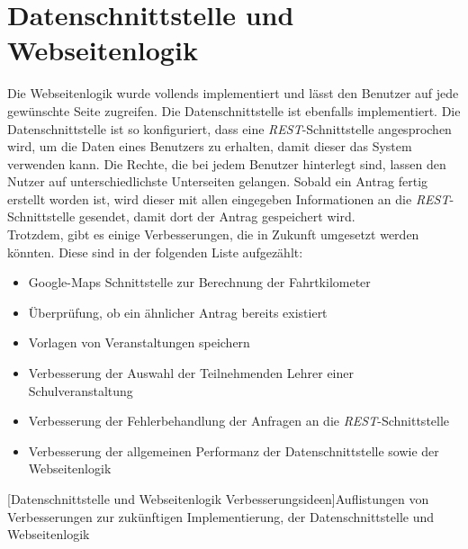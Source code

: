 \section{Datenschnittstelle und Webseitenlogik}
Die Webseitenlogik wurde vollends implementiert und lässt den Benutzer auf jede gewünschte Seite zugreifen. Die Datenschnittstelle ist ebenfalls implementiert. Die Datenschnittstelle ist so konfiguriert, dass eine \textit{REST}-Schnittstelle angesprochen wird, um die Daten eines Benutzers zu erhalten, damit dieser das System verwenden kann. Die Rechte, die bei jedem Benutzer hinterlegt sind, lassen den Nutzer auf unterschiedlichste Unterseiten gelangen. Sobald ein Antrag fertig erstellt worden ist, wird dieser mit allen eingegeben Informationen an die \textit{REST}-Schnittstelle gesendet, damit dort der Antrag gespeichert wird.\\

Trotzdem, gibt es einige Verbesserungen, die in Zukunft umgesetzt werden könnten. Diese sind in der folgenden Liste aufgezählt:
\begin{itemize}
	\item Google-Maps Schnittstelle zur Berechnung der Fahrtkilometer
	\item Überprüfung, ob ein ähnlicher Antrag bereits existiert
	\item Vorlagen von Veranstaltungen speichern
	\item Verbesserung der Auswahl der Teilnehmenden Lehrer einer Schulveranstaltung
	\item Verbesserung der Fehlerbehandlung der Anfragen an die \textit{REST}-Schnittstelle
	\item Verbesserung der allgemeinen Performanz der Datenschnittstelle sowie der Webseitenlogik
\end{itemize}
[Datenschnittstelle und Webseitenlogik Verbesserungsideen]{Auflistungen von Verbesserungen zur zukünftigen Implementierung, der Datenschnittstelle und Webseitenlogik}